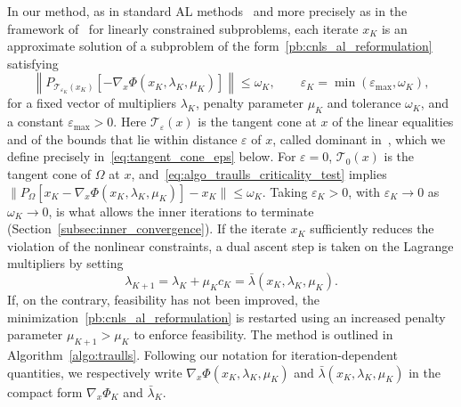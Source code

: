 \documentclass{article}
\numberwithin{equation}{section}
\newcommand{\calT}{{\mathcal{T}}}
\newcommand{\proj}[2]{P_{#1} \left[ {#2} \right]} %
\theoremstyle{plain}
\begin{document}
In our method, as in standard AL methods~\cite{conn-etal:1991,conn-etal:2000} and more precisely as in the framework of~\cite{conn-etal:1996b} for linearly constrained subproblems, each iterate $x_K$ is an approximate solution of a subproblem of the form~\eqref{pb:cnls_al_reformulation} satisfying
\begin{equation}\label{eq:algo_traulls_criticality_test}
	\left\|\proj{\calT_{\varepsilon_K}(x_K)}{-\nabla_x\Phi(x_K, \lambda_K, \mu_K)}\right\| \le \omega_K, \qquad \varepsilon_K = \min(\varepsilon_{\max},\omega_K),
\end{equation}
for a fixed vector of multipliers $\lambda_K$, penalty parameter $\mu_K$ and tolerance $\omega_K$, and a constant $\varepsilon_{\max} > 0$. Here $\calT_\varepsilon(x)$ is the tangent cone at $x$ of the linear equalities and of the bounds that lie within distance $\varepsilon$ of $x$, called dominant in~\cite{conn-etal:1996b}, which we define precisely in~\eqref{eq:tangent_cone_eps} below. For $\varepsilon = 0$, $\calT_0(x)$ is the tangent cone of $\Omega$ at $x$, and~\eqref{eq:algo_traulls_criticality_test} implies $\|\proj{\Omega}{x_K-\nabla_x\Phi(x_K, \lambda_K, \mu_K)}-x_K\| \le \omega_K$. Taking $\varepsilon_K > 0$, with $\varepsilon_K \to 0$ as $\omega_K \to 0$, is what allows the inner iterations to terminate (Section~\ref{subsec:inner_convergence}).
If the iterate $x_K$ sufficiently reduces the violation of the nonlinear constraints, a dual ascent step is taken on the Lagrange multipliers by setting
\begin{equation*}
	\lambda_{K+1} = \lambda_K + \mu_K c_K = \bar{\lambda}(x_K,\lambda_K,\mu_K).
\end{equation*}
If, on the contrary, feasibility has not been improved, the minimization~\eqref{pb:cnls_al_reformulation} is restarted using an increased penalty parameter $\mu_{K+1} > \mu_K$ to enforce feasibility. The method is outlined in Algorithm~\ref{algo:traulls}. Following our notation for iteration-dependent quantities, we respectively write $\nabla_x\Phi(x_K, \lambda_K, \mu_K)$ and $\bar{\lambda}(x_K,\lambda_K,\mu_K)$ in the compact form $\nabla_x \Phi_K$ and $\bar{\lambda}_K$.
\end{document}
